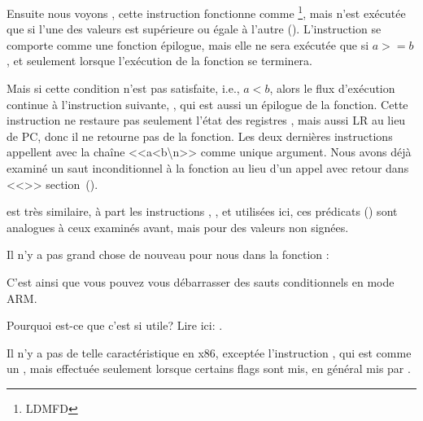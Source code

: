 
Ensuite nous voyons , cette instruction fonctionne comme \footnote{\ac{LDMFD}},
mais n'est exécutée que si l'une des valeurs est supérieure ou égale à l'autre
().
L'instruction  se comporte comme une fonction épilogue,
mais elle ne sera exécutée que si $a>=b$, et seulement lorsque l'exécution de la
fonction se terminera.


Mais si cette condition n'est pas satisfaite, i.e., $a<b$, alors le flux d'exécution
continue à l'instruction suivante, , qui est aussi
un épilogue de la fonction. Cette instruction ne restaure pas seulement l'état des
registres , mais aussi \ac{LR} au lieu de \ac{PC}, donc il ne retourne
pas de la fonction.
Les deux dernières instructions appellent \printf avec la chaîne <<a<b\textbackslash{}n>>
comme unique argument.
Nous avons déjà examiné un saut inconditionnel à la fonction \printf au lieu
d'un appel avec retour dans <<\PrintfSeveralArgumentsSectionName>> section~().

 est très similaire, à part les instructions , ,
et  utilisées ici, ces prédicats () sont analogues à ceux examinés avant, mais pour des
valeurs non signées.

Il n'y a pas grand chose de nouveau pour nous dans la fonction \main:



C'est ainsi que vous pouvez vous débarrasser des sauts conditionnels en mode ARM.

Pourquoi est-ce que c'est si utile? Lire ici: .


Il n'y a pas de telle caractéristique en x86, exceptée l'instruction ,
qui est comme un \MOV, mais effectuée seulement lorsque certains flags sont mis,
en général mis par \CMP.

\mysubparagraph{\OptimizingKeilVI (\ThumbMode)}

